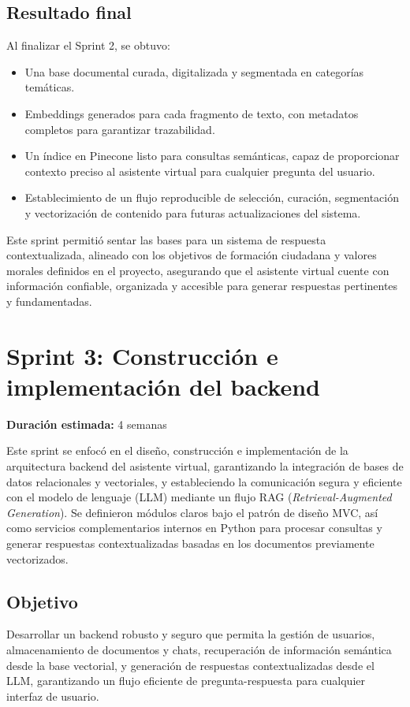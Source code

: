 \subsection{Resultado final}
Al finalizar el Sprint 2, se obtuvo:

\begin{itemize}
      \item Una base documental curada, digitalizada y segmentada en categorías temáticas.
      \item Embeddings generados para cada fragmento de texto, con metadatos completos para
            garantizar trazabilidad.
      \item Un índice en Pinecone listo para consultas semánticas, capaz de proporcionar
            contexto preciso al asistente virtual para cualquier pregunta del usuario.
      \item Establecimiento de un flujo reproducible de selección, curación, segmentación y
            vectorización de contenido para futuras actualizaciones del sistema.
\end{itemize}

Este sprint permitió sentar las bases para un sistema de respuesta
contextualizada, alineado con los objetivos de formación ciudadana y valores
morales definidos en el proyecto, asegurando que el asistente virtual cuente
con información confiable, organizada y accesible para generar respuestas
pertinentes y fundamentadas.

\section{Sprint 3: Construcción e implementación del backend}
\textbf{Duración estimada:} 4 semanas

Este sprint se enfocó en el diseño, construcción e implementación de la
arquitectura backend del asistente virtual, garantizando la integración de
bases de datos relacionales y vectoriales, y estableciendo la comunicación
segura y eficiente con el modelo de lenguaje (LLM) mediante un flujo RAG
(\textit{Retrieval-Augmented Generation}). Se definieron módulos claros bajo el
patrón de diseño MVC, así como servicios complementarios internos en Python
para procesar consultas y generar respuestas contextualizadas basadas en los
documentos previamente vectorizados.

\subsection{Objetivo}
Desarrollar un backend robusto y seguro que permita la gestión de usuarios,
almacenamiento de documentos y chats, recuperación de información semántica
desde la base vectorial, y generación de respuestas contextualizadas desde el
LLM, garantizando un flujo eficiente de pregunta-respuesta para cualquier
interfaz de usuario.

